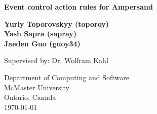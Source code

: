 \begin{titlepage}
    \begin{center}
        \vspace*{1cm}
        
        \textbf{ Event control action rules for Ampersand}
        
             
        \vspace{1.5cm}
        
        \textbf{Yuriy Toporovskyy (toporoy)\\ Yash Sapra (sapray) \\ Jaeden Guo 
    (guoy34)}
        
        \vfill
        
        Supervised by: Dr. Wolfram Kahl
        
        \vspace{0.8cm}
        
        
        Department of Computing and Software\\
        McMaster University\\
        Ontario, Canada\\
        \today
        
    \end{center}
\end{titlepage}